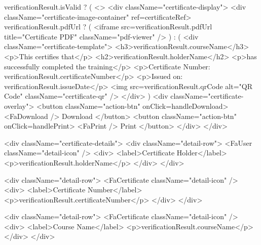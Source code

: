 {{{              {verificationResult.isValid ? (
                <>
                  <div className="certificate-display">
                    <div className="certificate-image-container" ref={certificateRef}>
                      {verificationResult.pdfUrl ? (
                        <iframe 
                          src={verificationResult.pdfUrl} 
                          title="Certificate PDF"
                          className="pdf-viewer"
                        />
                      ) : (
                        <div className="certificate-template">
                          <h3>{verificationResult.courseName}</h3>
                          <p>This certifies that</p>
                          <h2>{verificationResult.holderName}</h2>
                          <p>has successfully completed the training</p>
                          <p>Certificate Number: {verificationResult.certificateNumber}</p>
                          <p>Issued on: {verificationResult.issueDate}</p>
                          <img src={verificationResult.qrCode} alt="QR Code" className="certificate-qr" />
                        </div>
                      )}
                      <div className="certificate-overlay">
                        <button className="action-btn" onClick={handleDownload}>
                          <FaDownload /> Download
                        </button>
                        <button className="action-btn" onClick={handlePrint}>
                          <FaPrint /> Print
                        </button>
                      </div>
                    </div>

                    <div className="certificate-details">
                      <div className="detail-row">
                        <FaUser className="detail-icon" />
                        <div>
                          <label>Certificate Holder</label>
                          <p>{verificationResult.holderName}</p>
                        </div>
                      </div>

                      <div className="detail-row">
                        <FaCertificate className="detail-icon" />
                        <div>
                          <label>Certificate Number</label>
                          <p>{verificationResult.certificateNumber}</p>
                        </div>
                      </div>

                      <div className="detail-row">
                        <FaCertificate className="detail-icon" />
                        <div>
                          <label>Course Name</label>
                          <p>{verificationResult.courseName}</p>
                        </div>
                      </div>

}}}}

